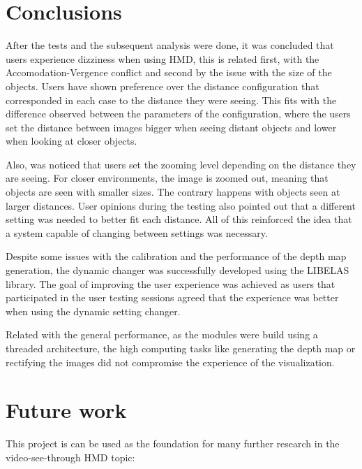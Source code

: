 \documentclass[10pt,a4paper,twocolumn,twoside]{article}
\begin{document}
	
	\section{Conclusions}
	After the tests and the subsequent analysis were done, it was concluded that users experience dizziness when using HMD, this is related first, with the Accomodation-Vergence conflict and second by the issue with the size of the objects.
	Users have shown preference over the distance configuration that corresponded in each case to the distance they were seeing. This fits with the difference observed between the parameters of the configuration, where the users set the distance between images bigger when seeing distant objects and lower when looking at closer objects. 
	
	Also, was noticed that users set the zooming level depending on the distance they are seeing. For closer environments, the image is zoomed out, meaning that objects are seen with smaller sizes. The contrary happens with objects seen at larger distances. User opinions during the testing also pointed out that a different setting was needed to better fit each distance. All of this reinforced the idea that a system capable of changing between settings was necessary. 
	
	Despite some issues with the calibration and the performance of the depth map generation, the dynamic changer was successfully developed using the LIBELAS library. The goal of improving the user experience was achieved as users that participated in the user testing sessions agreed that the experience was better when using the dynamic setting changer. 
	
	Related with the general performance, as the modules were build using a threaded architecture, the high computing tasks like generating the depth map or rectifying the images did not compromise the experience of the visualization. 
	
	
	\section{Future work}
	This project is can be used as the foundation for many further research in the video-see-through HMD topic: 
	
\end{document}
